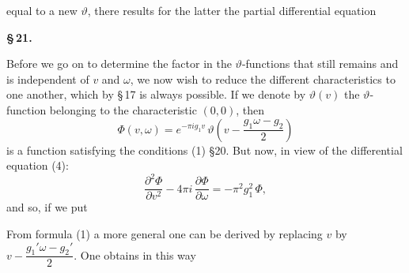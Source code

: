 equal to a new $\vartheta$, there results for the latter the partial
differential equation



\begin{center}
\textbf{\S\,21.\quad{}}

\textbf{}
\end{center}

Before we go on to determine the factor in the $\vartheta$-functions
that still remains and is independent of $v$ and $\omega$, we now wish
to reduce the different characteristics to one another, which
by \S\,17 is always possible. If we denote by
$\vartheta(v)$ the $\vartheta$-function belonging to the characteristic $(0, 0)$, then
\[
\Phi(v,\omega) = e^{-\pi i g_1 v}\, \vartheta\!\left(v - \frac{g_1\omega - g_2}{2}\right)
\]
is a function satisfying the conditions (1) \S 20. But now, in
view of the differential equation (4):
\[
\frac{\partial^2 \Phi}{\partial v^2} - 4\pi i\,\frac{\partial \Phi}{\partial \omega} = -\pi^2 g_1^2\,\Phi,
\]
and so, if we put



From formula (1) a more general one can be derived by
replacing $v$ by $v - \dfrac{g_1'\omega - g_2'}{2}$. One obtains in this way


